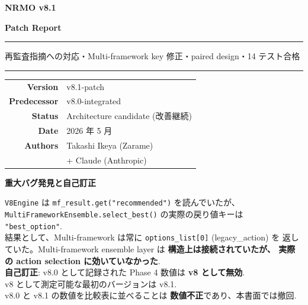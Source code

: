 \documentclass[a4paper,11pt]{report}
\begin{document}
\begin{titlepage}
  \centering
  \vspace*{2cm}
  
  {\Huge\bfseries\color{navy} NRMO v8.1\par}
  \vspace{0.5cm}
  {\Large\bfseries\color{navy} Patch Report\par}
  \vspace{1.5cm}
  
  \rule{\linewidth}{0.5pt}
  \vspace{0.5cm}
  
  {\large 再監査指摘への対応・Multi-framework key 修正・paired design・14 テスト合格\par}
  
  \vspace{0.5cm}
  \rule{\linewidth}{0.5pt}
  \vspace{2cm}
  
  \begin{tabular}{rl}
    \textbf{Version} & v8.1-patch \\
    \textbf{Predecessor} & v8.0-integrated \\
    \textbf{Status} & Architecture candidate (改善継続) \\
    \textbf{Date} & 2026 年 5 月 \\
    \textbf{Authors} & Takashi Ikeya (Zarame) \\
                     & + Claude (Anthropic) \\
  \end{tabular}
  
  \vfill
  
  \begin{tcolorbox}[colback=red!5, colframe=red, width=0.85\textwidth]
    \textbf{重大バグ発見と自己訂正}\par
    \texttt{V8Engine} は \texttt{mf\_result.get("recommended")} を読んでいたが、
    \texttt{MultiFrameworkEnsemble.select\_best()} の実際の戻り値キーは
    \texttt{"best\_option"}.\\
    結果として、Multi-framework は常に \texttt{options\_list[0]} (legacy\_action) を
    返していた。Multi-framework ensemble layer は \textbf{構造上は接続されていたが、
    実際の action selection に効いていなかった}.\\[0.3em]
    \textbf{自己訂正}: v8.0 として記録された Phase 4 数値は \textbf{v8 として無効}.\\
    v8 として測定可能な最初のバージョンは v8.1.\\
    v8.0 と v8.1 の数値を比較表に並べることは \textbf{数値不正}であり、本書面では撤回.
  \end{tcolorbox}
  
\end{titlepage}
\end{document}
